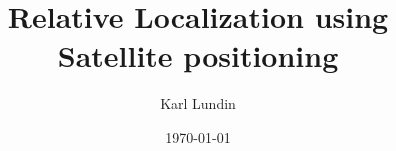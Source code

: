 \documentclass{Template/kthlatex-0.2rc4/kththesis/kththesis}
\title{Relative Localization using Satellite positioning}
\author{Karl Lundin}
\date{\today}
\begin{document}
\frontmatter

\titlepage


\tableofcontents
\mainmatter
 

 








\appendix

\end{document}
